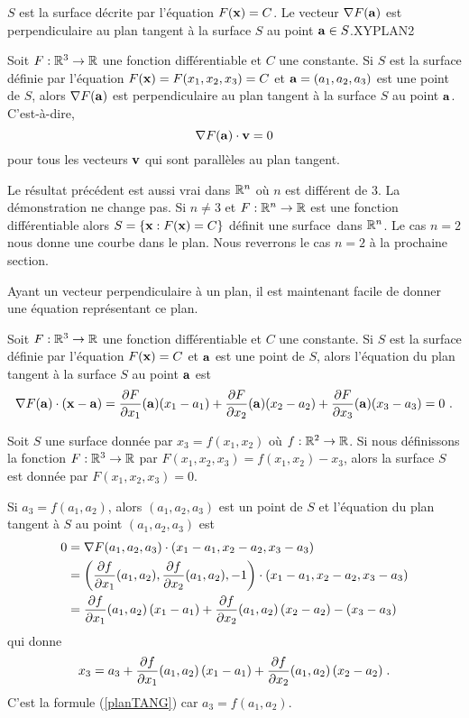 {
{$S$ est la surface décrite par l'équation $F(\mathbf{x})= C$.   Le
vecteur $\nabla F(\mathbf{a})$ est perpendiculaire au plan tangent à la
surface $S$ au point $\mathbf{a} \in S$.}{XYPLAN2}

\begin{focus}{\prp}
Soit $F:\mathbb{R}^3\rightarrow \mathbb{R}$ une fonction différentiable et $C$ une
constante.  Si $S$ est la surface définie par l'équation
$F(\mathbf{x})=F(x_1,x_2,x_3)=C$ et $\mathbf{a}=(a_1,a_2,a_3)$ est une point
de $S$, alors $\nabla F(\mathbf{a})$ est perpendiculaire au plan tangent à
la surface $S$ au point $\mathbf{a}$.  C'est-à-dire,
\[
\nabla F(\mathbf{a})\cdot \mathbf{v} = 0
\]
pour tous les vecteurs $\mathbf{v}$ qui sont parallèles au plan tangent.
\end{focus}

\begin{rmk}
Le résultat précédent est aussi vrai dans $\mathbb{R}^n$ où $n$ est différent
de $3$.  La démonstration ne change pas.  Si $n\neq 3$ et
$F:\mathbb{R}^n \rightarrow \mathbb{R}$ est une fonction différentiable alors
$S = \{ \mathbf{x} : F(\mathbf{x})=C \}$ définit une \flqq surface\frqq\ 
dans $\mathbb{R}^n$.  Le cas $n=2$ nous donne une courbe dans le plan.  Nous
reverrons le cas $n=2$ à la prochaine section.
\label{orthogGRAD}
\end{rmk}

Ayant un vecteur perpendiculaire à un plan, il est maintenant facile de
donner une équation représentant ce plan.

\begin{focus}{\prp}
Soit $F:\mathbb{R}^3\rightarrow \mathbb{R}$ une fonction différentiable et $C$ une
constante.  Si $S$ est la surface définie par l'équation $F(\mathbf{x})=C$ et
$\mathbf{a}$ est une point de $S$, alors l'équation du plan tangent à la
surface $S$ au point $\mathbf{a}$ est 
\[
\nabla F(\mathbf{a})\cdot (\mathbf{x} - \mathbf{a}) =
\frac{\partial F}{\partial x_1}(\mathbf{a})(x_1-a_1) + \frac{\partial F}{\partial x_2}(\mathbf{a})(x_2-a_2)
+\frac{\partial F}{\partial x_3}(\mathbf{a})(x_3-a_3)=0 \ .
\]
\end{focus}

\begin{rmk}
Soit $S$ une surface donnée par $x_3=f(x_1,x_2)$ où
$f:\mathbb{R}^2\rightarrow \mathbb{R}$.  Si nous définissons la fonction
$F:\mathbb{R}^3 \rightarrow \mathbb{R}$ par $F(x_1,x_2,x_3) = f(x_1,x_2) - x_3$,
alors la surface $S$ est donnée par $F(x_1,x_2,x_3)=0$.

Si $a_3=f(a_1,a_2)$, alors $(a_1,a_2,a_3)$ est un point de $S$ et
l'équation du plan tangent à $S$ au point $(a_1,a_2,a_3)$ est
\begin{align*}
0 &= \nabla F(a_1,a_2,a_3)\cdot (x_1-a_1,x_2-a_2,x_3-a_3) \\
&= \left(\frac{\partial f}{\partial x_1}(a_1,a_2), \frac{\partial f}{\partial x_2}(a_1,a_2), -1\right)
\cdot (x_1-a_1,x_2-a_2,x_3-a_3) \\
&= \frac{\partial f}{\partial x_1}(a_1,a_2) \,(x_1-a_1) + \frac{\partial f}{\partial x_2}(a_1,a_2)\,(x_2-a_2)
-(x_3-a_3)
\end{align*}
qui donne
\[
x_3 = a_3 + \frac{\partial f}{\partial x_1}(a_1,a_2) \,(x_1-a_1)
+ \frac{\partial f}{\partial x_2}(a_1,a_2)\,(x_2-a_2) \; .
\]
C'est la formule (\ref{planTANG}) car $a_3 = f(a_1,a_2)$.
\end{rmk}

}

